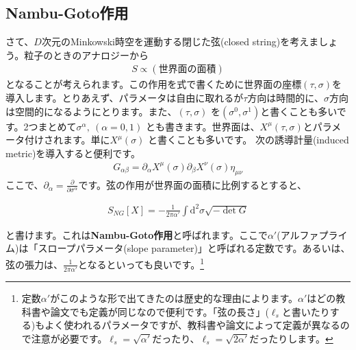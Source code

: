 \documentclass[report,paper=a4, fontsize=12pt, line_length=16cm, number_of_lines=34,dvipdfmx]{jlreq}
\newenvironment{important}{\begin{tcolorbox}[
  colback = white,
  colframe = red!35,
  boxrule = 2mm,
  fonttitle = \bfseries,
  after = \noindent] }{\end{tcolorbox}}
\numberwithin{equation}{chapter}
\numberwithin{equation}{section}
\newcommand{\del}{\partial}
\newcommand{\kyou}[1]{{\sffamily \bfseries #1}}
\newcommand{\di}{\mathrm{d}}
\begin{document}
\subsection{Nambu-Goto作用}
さて、$D$次元のMinkowski時空を運動する閉じた弦(closed string)を考えましょう。粒子のときのアナロジーから
\begin{align}
 S \propto (\text{世界面の面積})
\end{align}
となることが考えられます。この作用を式で書くために世界面の座標$(\tau,\sigma)$を導入します。とりあえず、パラメータは自由に取れるが$\tau$方向は時間的に、$\sigma$方向 は空間的になるようにとります。また、$(\tau,\sigma)$ を$(\sigma^0,\sigma^1)$と書くことも多いです。2つまとめて$\sigma^{\alpha},\ (\alpha=0,1)$ とも書きます。世界面は、$X^{\mu}(\tau,\sigma)$とパラメータ付けされます。単に$X^{\mu}(\sigma)$ と書くことも多いです。
次の誘導計量(induced metric)を導入すると便利です。
\begin{align} G_{\alpha\beta}=\del_{\alpha}X^{\mu}(\sigma)\del_{\beta}X^{\nu}(\sigma)\eta_{\mu\nu}
\end{align}
ここで、$\del_{\alpha}=\frac{\del}{\del\sigma^{\alpha}}$です。弦の作用が世界面の面積に比例するとすると、
\begin{important}
  \begin{align}
    S_{NG}[X]=-\frac{1}{2\pi\alpha'}\int \di^2\sigma
   \sqrt{-\det G}\label{NG}
   \end{align}     
\end{important}
と書けます。これは\kyou{Nambu-Goto作用}と呼ばれます。ここで$\alpha'$(アルファプライム)は「スロープパラメータ(slope parameter)」と呼ばれる定数です。あるいは、弦の張力は、$\frac{1}{2\pi\alpha'}$となるといっても良いです。\footnote{定数$\alpha'$がこのような形で出てきたのは歴史的な理由によります。$\alpha'$はどの教科書や論文でも定義が同じなので便利です。「弦の長さ」($\ell_s$と書いたりする)もよく使われるパラメータですが、教科書や論文によって定義が異なるので注意が必要です。$\ell_s=\sqrt{\alpha'}$だったり、$\ell_s=\sqrt{2\alpha'}$だったりします。
}
\end{document}
